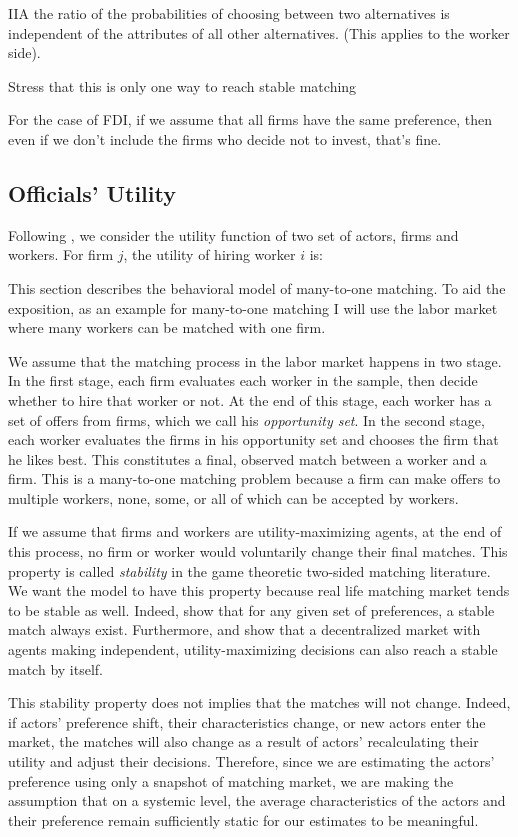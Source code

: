 IIA the ratio of the probabilities of choosing between two alternatives is
independent of the attributes of all other alternatives. (This applies to the
worker side).

Stress that this is only one way to reach stable matching

For the case of FDI, if we assume that all firms have the same preference, then
even if we don't include the firms who decide not to invest, that's fine.

\subsection{Officials' Utility}

Following \citet{Logan1998}, we consider the utility function of two set of
actors, firms and workers. For firm $j$, the utility of hiring worker $i$ is:

This section describes the behavioral model of many-to-one matching. To aid the
exposition, as an example for many-to-one matching I will use the labor market
where many workers can be matched with one firm.

We assume that the matching process in the labor market happens in two stage.
In the first stage, each firm evaluates each worker in the sample, then
decide whether to hire that worker or not. At the end of this stage, each worker
has a set of offers from firms, which we call his \textit{opportunity
  set}. In the second stage, each worker evaluates the firms in his
opportunity set and chooses the firm that he likes best. This constitutes a
final, observed match between a worker and a firm. This is a many-to-one
matching problem because a firm can make offers to multiple
workers, none, some, or all of which can be accepted by workers.

If we assume that firms and workers are utility-maximizing agents, at the end of
this process, no firm or worker would voluntarily change their final matches.
This property is called \textit{stability} in the game theoretic two-sided
matching literature. We want the model to have this property because real life
matching market tends to be stable as well. Indeed, \citep{Roth1992} show that
for any given set of preferences, a stable match always exist. Furthermore,
\citep{Roth2016} and \citep{Adachi2003} show that a decentralized market with
agents making independent, utility-maximizing decisions can also reach a stable
match by itself.

This stability property does not implies that the matches will not change.
Indeed, if actors' preference shift, their characteristics change, or new actors
enter the market, the matches will also change as a result of actors'
recalculating their utility and adjust their decisions. Therefore, since we are
estimating the actors' preference using only a snapshot of matching market, we
are making the assumption that on a systemic level, the average characteristics of the
actors and their preference remain sufficiently static for our estimates to be meaningful.

